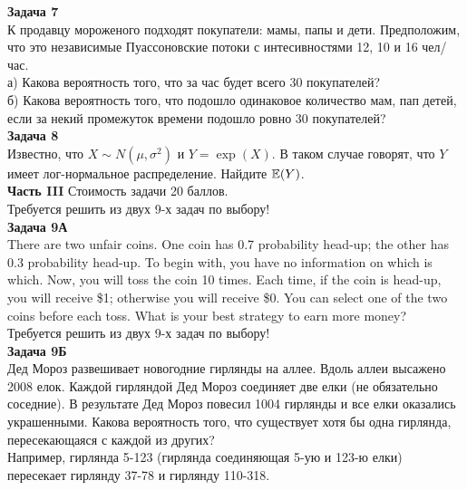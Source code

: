 \documentclass[12pt, a4paper]{article}\usepackage[]{graphicx}\usepackage[]{color}
\begin{document}


	\textbf{Задача 7} \\
	К продавцу мороженого подходят покупатели: мамы, папы и дети. Предположим, что это независимые Пуассоновские потоки с интесивностями 12, 10 и 16 чел/час. \\
	а) Какова вероятность того, что за час будет всего 30 покупателей? \\
	б) Какова вероятность того, что подошло одинаковое количество мам, пап детей, если за некий промежуток времени подошло ровно 30 покупателей? \\


	\textbf{Задача 8} \\ %
	Известно, что $X\sim N(\mu,\sigma^{2})$ и $Y=\exp(X)$. В таком случае говорят, что $Y$ имеет лог-нормальное распределение. Найдите $\mathbb{E}(Y)$. \\



	\textbf{Часть III} Стоимость задачи 20 баллов. \\

	Требуется решить \textbf{} из двух 9-х задач по
	выбору! \\


	\textbf{Задача 9А} \\
	There are two unfair coins. One coin has 0.7 probability head-up; the other has 0.3 probability head-up. To begin with, you have no information on which is which. Now, you will toss the coin 10 times. Each time, if the coin is head-up, you will receive \$1; otherwise you will receive \$0. You can select one of the two coins before each toss. What is your best strategy to earn more money? \\



	Требуется решить \textbf{} из двух 9-х задач по
	выбору! \\



	\textbf{Задача 9Б} \\
	Дед Мороз развешивает новогодние гирлянды на аллее. Вдоль аллеи высажено 2008 елок. Каждой гирляндой Дед Мороз соединяет две елки (не обязательно соседние). В результате Дед Мороз повесил 1004 гирлянды и все елки оказались украшенными. Какова вероятность того, что существует хотя бы одна гирлянда, пересекающаяся с каждой из других? \\
	Например, гирлянда 5-123 (гирлянда соединяющая 5-ую и 123-ю елки) пересекает гирлянду 37-78 и гирлянду 110-318.
\end{document}
